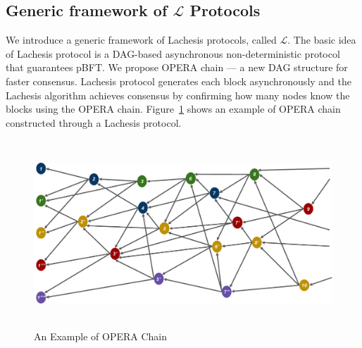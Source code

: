 \documentclass[preprint,12pt]{elsarticle}
\begin{document}
\subsection{Generic framework of $\mathcal{L}$ Protocols}
We introduce a generic framework of Lachesis protocols, called $\mathcal{L}$. The basic idea of Lachesis protocol is a DAG-based asynchronous non-deterministic protocol that guarantees pBFT.
We propose OPERA chain --- a new DAG structure for faster consensus. Lachesis protocol generates each block asynchronously and the Lachesis algorithm achieves consensus by confirming how many nodes know the blocks using the OPERA chain.
Figure~\ref{fig:operachain} shows an example of OPERA chain constructed through a Lachesis protocol.
\begin{figure}[h] \centering
	\includegraphics[height=7cm, width=1.0\columnwidth]{lachesis_output}
	\caption{An Example of OPERA Chain}
	\label{fig:operachain}
\end{figure}
\end{document}
